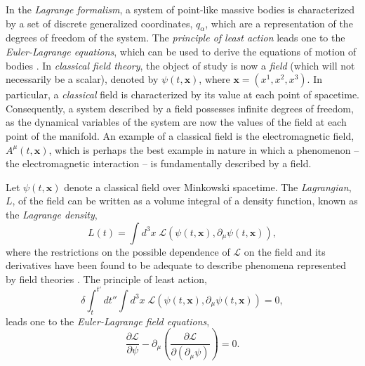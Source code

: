 \documentclass[
12pt,		%
openright,	%
twoside,  %
a4paper,			%
chapter=TITLE,		%
english,			%
french,				%
spanish,			%
brazil				%
]{USPSC-classe/USPSC}
\begin{document}
In the \textit{Lagrange formalism}, a system of point-like massive bodies is characterized by a set of discrete generalized coordinates, $q_{\alpha}$, which are a representation of the degrees of freedom of the system. The \textit{principle of least action} leads one to the \textit{Euler-Lagrange equations}, which can be used to derive the equations of motion of bodies \cite{Greiner1996}. In \textit{classical field theory}, the object of study is now a \textit{field} (which will not necessarily be a scalar), denoted by $\psi(t,\textbf{x})$, where $\textbf{x}=(x^1,x^2,x^3)$. In particular, a \textit{classical} field is characterized by its value at each point of spacetime. Consequently, a system described by a field possesses infinite degrees of freedom, as the dynamical variables of the system are now the values of the field at each point of the manifold. An example of a classical field is the electromagnetic field, $A^{\mu}(t,\textbf{x})$, which is perhaps the best example in nature in which a phenomenon -- the electromagnetic interaction -- is fundamentally described by a field.

Let $\psi(t,\textbf{x})$ denote a classical field over Minkowski spacetime. The \textit{Lagrangian}, $L$, of the field can be written as a volume integral of a density function, known as the \textit{Lagrange density},
\begin{equation}
    L(t)=\int d^3x\;\mathcal{L}(\psi(t,\textbf{x}),\partial_{\mu}\psi(t,\textbf{x})),
\end{equation}
where the restrictions on the possible dependence of $\mathcal{L}$ on the field and its derivatives have been found to be adequate to describe phenomena represented by field theories \cite{Greiner1996}. The principle of least action,
\begin{equation}
    \delta\int_{t}^{t'} dt'' \int d^3x\;\mathcal{L}(\psi(t,\textbf{x}),\partial_{\mu}\psi(t,\textbf{x}))=0,
\end{equation}
leads one to the \textit{Euler-Lagrange field equations},
\begin{equation}
    \frac{\partial \mathcal{L}}{\partial\psi}-\partial_{\mu}\left(\frac{\partial \mathcal{L}}{\partial(\partial_{\mu}\psi)}\right)=0.
\end{equation}
\end{document}

